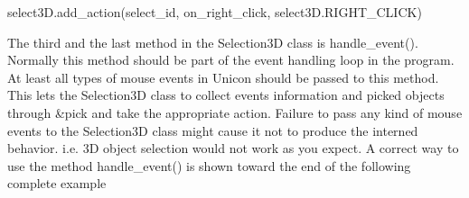 \documentclass[letterpaper]{article}
\begin{document}
\bigskip

{\sffamily
select3D.add\_action(select\_id, on\_right\_click, select3D.RIGHT\_CLICK)~~ \newline
}

The third and the last method in the Selection3D class is
\textsf{handle\_event()}. Normally this method should be part
of the event handling loop in the program. At least all types of mouse
events in Unicon should be passed to this method. This lets the
\textsf{Selection3D} class to collect events information and picked
objects through \textsf{\&pick} and take the appropriate
action. Failure to pass any kind of mouse events to the
\textsf{Selection3D} class might cause it not to produce the interned
behavior. i.e. 3D object selection would not work as you expect. A
correct way to use the method \textsf{handle\_event()} is
shown toward the end of the following complete example

\ \\
\end{document}
